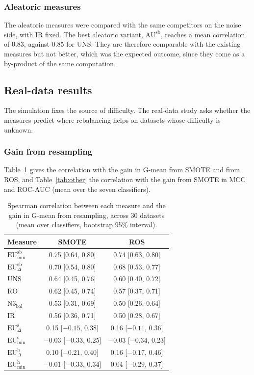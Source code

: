 \documentclass[preprint,12pt]{elsarticle}
\newcommand{\EUmin}[1]{\mathrm{EU}^{\mathrm{#1}}_{\min}}
\newcommand{\EUdif}[1]{\mathrm{EU}^{\mathrm{#1}}_{\Delta}}
\newcommand{\AUbal}[1]{\mathrm{AU}^{\mathrm{#1}}}
\newcommand{\IR}{\mathrm{IR}}
\newcommand{\UNS}{\mathrm{UNS}}
\newcommand{\RO}{\mathrm{RO}}
\newcommand{\Nbal}{\mathrm{N3}_{\mathrm{bal}}}
\begin{document}
\subsubsection{Aleatoric measures}
The aleatoric measures were compared with the same competitors on the noise side, with $\IR$ fixed. The best aleatoric variant, $\AUbal{sb}$, reaches a mean correlation of 0.83, against 0.85 for $\UNS$. They are therefore comparable with the existing measures but not better, which was the expected outcome, since they come as a by-product of the same computation.


\subsection{Real-data results}\label{sec:realres}
The simulation fixes the source of difficulty. The real-data study asks whether the measures predict where rebalancing helps on datasets whose difficulty is unknown.

\subsubsection{Gain from resampling}
Table~\ref{tab:real} gives the correlation with the gain in G-mean from SMOTE and from ROS, and Table~\ref{tab:other} the correlation with the gain from SMOTE in MCC and ROC-AUC (mean over the seven classifiers).

\begin{table}[H]
\centering
\caption{Spearman correlation between each measure and the gain in G-mean from resampling, across 30 datasets (mean over classifiers, bootstrap 95\% interval).}\label{tab:real}
\small\setlength{\tabcolsep}{4pt}
\begin{tabular}{lcc}
\toprule
Measure & SMOTE & ROS \\
\midrule
$\EUmin{sb}$ & 0.75 [0.64, 0.80] & 0.74 [0.63, 0.80] \\
$\EUdif{sb}$ & 0.70 [0.54, 0.80] & 0.68 [0.53, 0.77] \\
$\UNS$ & 0.64 [0.45, 0.76] & 0.60 [0.40, 0.72] \\
$\RO$ & 0.62 [0.45, 0.74] & 0.57 [0.37, 0.71] \\
$\Nbal$ & 0.53 [0.31, 0.69] & 0.50 [0.26, 0.64] \\
$\IR$ & 0.56 [0.36, 0.71] & 0.50 [0.28, 0.67] \\
$\EUdif{s}$ & 0.15 [$-0.15$, 0.38] & 0.16 [$-0.11$, 0.36] \\
$\EUmin{s}$ & $-0.03$ [$-0.33$, 0.25] & $-0.03$ [$-0.34$, 0.23] \\
$\EUdif{h}$ & 0.10 [$-0.21$, 0.40] & 0.16 [$-0.17$, 0.46] \\
$\EUmin{h}$ & $-0.01$ [$-0.33$, 0.34] & 0.04 [$-0.29$, 0.37] \\
\bottomrule
\end{tabular}
\end{table}
\end{document}
